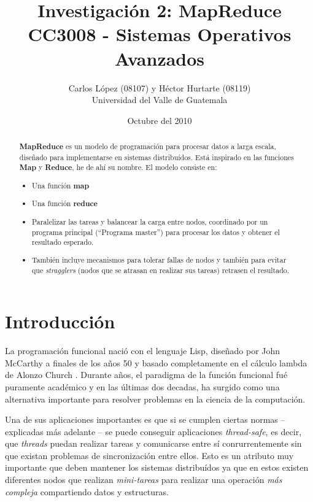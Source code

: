 \documentclass[spanish]{article}
\begin{document}
\title{Investigaci\'{o}n 2: MapReduce \linebreak
CC3008 - Sistemas Operativos Avanzados } 
\author{Carlos López (08107) y Héctor Hurtarte (08119) \\ 
Universidad del Valle de Guatemala}
\date{Octubre del 2010}
\maketitle

\begin{abstract}
  \textbf{MapReduce} es un modelo de programación para procesar datos a larga escala, diseñado para implementarse en sistemas distribuídos. Está inspirado en las funciones \textbf{Map} y \textbf{Reduce}, he de ahí su nombre. El modelo consiste en:
  \begin{itemize}
    \item Una función \textbf{map}
    \item Una función \textbf{reduce}
    \item Paralelizar las tareas y balancear la carga entre nodos, coordinado por un programa principal (``Programa master'') para procesar los datos y obtener el resultado esperado.
    \item También incluye mecanismos para tolerar fallas de nodos y también para evitar que \textit{stragglers} (nodos que se atrasan en realizar sus tareas) retrasen el resultado.
  \end{itemize}
\end{abstract}

\section{Introducción}
La programación funcional nació con el lenguaje Lisp, diseñado por John McCarthy a finales de los años 50 y basado completamente en el cálculo lambda de Alonzo Church \cite{HistoriaLisp}. Durante años, el paradigma de la función funcional fué puramente académico y en las últimas dos decadas, ha surgido como una alternativa importante para resolver problemas en la ciencia de la computación.

Una de sus aplicaciones importantes es que si se cumplen ciertas normas -- explicadas más adelante -- se puede conseguir aplicaciones \textit{thread-safe}, es decir, que \textit{threads} puedan realizar tareas y comunicarse entre sí conrurrentemente sin que existan problemas de sincronización entre ellos. Esto es un atributo muy importante que deben mantener los sistemas distribuídos ya que en estos existen diferentes nodos que realizan \textit{mini-tareas} para realizar una operación \textit{más compleja} compartiendo datos y estructuras.
\end{document}
